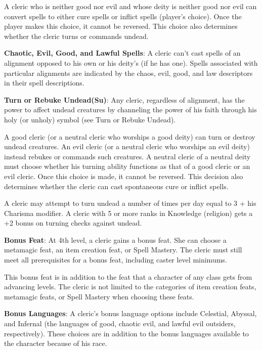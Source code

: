 A cleric who is neither good nor evil and whose deity is neither good nor evil can convert spells to either cure spells or inflict spells (player’s choice). Once the player makes this choice, it cannot be reversed. This choice also determines whether the cleric turns or commands undead.

\textbf{Chaotic, Evil, Good, and Lawful Spells}: A cleric can’t cast spells of an alignment opposed to his own or his deity’s (if he has one). Spells associated with particular alignments are indicated by the chaos, evil, good, and law descriptors in their spell descriptions.

\textbf{Turn or Rebuke Undead(Su)}: Any cleric, regardless of alignment, has the power to affect undead creatures by channeling the power of his faith through his holy (or unholy) symbol (see Turn or Rebuke Undead).

A good cleric (or a neutral cleric who worships a good deity) can turn or destroy undead creatures. An evil cleric (or a neutral cleric who worships an evil deity) instead rebukes or commands such creatures. A neutral cleric of a neutral deity must choose whether his turning ability functions as that of a good cleric or an evil cleric. Once this choice is made, it cannot be reversed. This decision also determines whether the cleric can cast spontaneous cure or inflict spells.

A cleric may attempt to turn undead a number of times per day equal to 3 + his Charisma modifier. A cleric with 5 or more ranks in Knowledge (religion) gets a +2 bonus on turning checks against undead.

\textbf{Bonus Feat}: At 4th level, a cleric gains a bonus feat. She can choose a metamagic feat, an item creation feat, or Spell Mastery. The cleric must still meet all prerequisites for a bonus feat, including caster level minimums.

This bonus feat is in addition to the feat that a character of any class gets from advancing levels. The cleric is not limited to the categories of item creation feats, metamagic feats, or Spell Mastery when choosing these feats.

\textbf{Bonus Languages}: A cleric’s bonus language options include Celestial, Abyssal, and Infernal (the languages of good, chaotic evil, and lawful evil outsiders, respectively). These choices are in addition to the bonus languages available to the character because of his race.